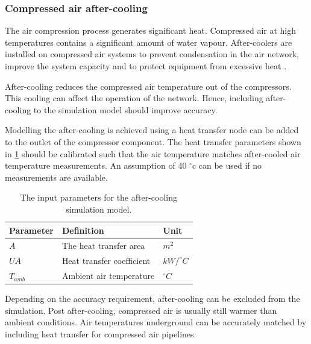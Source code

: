 		\subsubsection{Compressed air after-cooling}
		The air compression process generates significant heat. Compressed air at high temperatures contains a significant amount of water vapour. After-coolers are installed on compressed air systems to prevent condensation in the air network, improve the system capacity and to protect equipment from excessive heat \cite{schroeder2009energy}.
		\par 
		After-cooling reduces the compressed air temperature out of the compressors. This cooling can affect the operation of the network. Hence, including after-cooling to the simulation model should improve accuracy.
		\par
		Modelling the after-cooling is achieved using a heat transfer node can be added to the outlet of the compressor component. The heat transfer parameters shown in \cref{table: After cooling inputs} should be calibrated such that the air temperature matches after-cooled air temperature measurements. An assumption of 40 $^\circ$\gls{c} can be used if no measurements are available.
		\begin{table}
			\centering
			\begin{tabular}{lll}
				\hline 
				Parameter \hspace{1cm} & Definition \hspace{4cm} & Unit \\
				\hline
				$A$ & The heat transfer area & $m^2$ \\
				$UA$ & Heat transfer coefficient & $kW/^{\circ} C$ \\
				$T_{amb}$ & Ambient air temperature & $^{\circ} C$ \\
				\hline
			\end{tabular}
		\caption{The input parameters for the after-cooling simulation model.}
		\label{table: After cooling inputs}
		\end{table}
	Depending on the accuracy requirement, after-cooling can be excluded from the simulation. Post after-cooling, compressed air is usually still warmer than ambient conditions. Air temperatures underground can be accurately matched by including heat transfer for compressed air pipelines.
	
